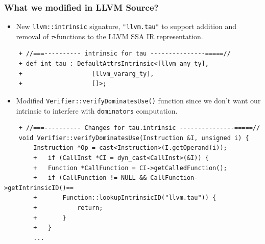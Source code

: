 \documentclass[aspectratio=169, compress]{beamer}
\begin{document}
\begin{frame}[fragile]
	\frametitle{What we modified in LLVM Source?}
	\begin{itemize}
		\item New \texttt{llvm::intrinsic} signature, \texttt{"llvm.tau"} to support addition and removal of $\tau$-functions to the LLVM SSA IR representation. \pause
	\end{itemize}
	\begin{verbatim}
	+ //===---------- intrinsic for tau ---------------=====//
	+ def int_tau : DefaultAttrsIntrinsic<[llvm_any_ty],
	+                   [llvm_vararg_ty],
	+                   []>;
	\end{verbatim}
	\pause
	\begin{itemize}
		\item Modified \texttt{Verifier::verifyDominatesUse()} function since we don't want our intrinsic to interfere with \texttt{dominators} computation.  \pause
	\end{itemize}
	\begin{verbatim}
	+ //===---------- Changes for tau.intrinsic ---------------=====//
	void Verifier::verifyDominatesUse(Instruction &I, unsigned i) {
		Instruction *Op = cast<Instruction>(I.getOperand(i));
		+	if (CallInst *CI = dyn_cast<CallInst>(&I)) {
		+	Function *CallFunction = CI->getCalledFunction();
		+	if (CallFunction != NULL && CallFunction->getIntrinsicID()==
		+		Function::lookupIntrinsicID("llvm.tau")) {
		+			return;
		+		}
		+	}
		...
	\end{verbatim}
\end{frame}
\end{document}
